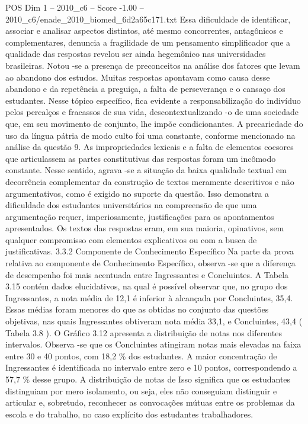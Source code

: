 \begin{textsample}{POS Dim 1 – 2010\_c6 – Score -1.00 – 2010\_c6/enade\_2010\_biomed\_6d2a65c171.txt}
Essa dificuldade de identificar, associar e analisar aspectos distintos, até mesmo concorrentes, antagônicos e complementares, denuncia a fragilidade de um pensamento simplificador que a qualidade das respostas revelou ser ainda hegemônico nas universidades brasileiras.
Notou -se a presença de preconceitos na análise dos fatores que levam ao abandono dos estudos.
Muitas respostas apontavam como causa desse abandono e da repetência a preguiça, a falta de perseverança e o cansaço dos estudantes.
Nesse tópico específico, fica evidente a responsabilização do indivíduo pelos percalços e fracassos de sua vida, descontextualizando -o de uma sociedade que, em seu movimento de conjunto, lhe impõe condicionantes.
A precariedade do uso da língua pátria de modo culto foi uma constante, conforme mencionado na análise da questão 9.
As impropriedades lexicais e a falta de elementos coesores que articulassem as partes constitutivas das respostas foram um incômodo constante.
Nesse sentido, agrava -se a situação da baixa qualidade textual em decorrência complementar da construção de textos meramente descritivos e não argumentativos, como é exigido no suporte da questão.
Isso demonstra a dificuldade dos estudantes universitários na compreensão de que uma argumentação requer, imperiosamente, justificações para os apontamentos apresentados.
Os textos das respostas eram, em sua maioria, opinativos, sem qualquer compromisso com elementos explicativos ou com a busca de justificativas. 3.3.2 Componente de Conhecimento Específico Na parte da prova relativa ao componente de Conhecimento Específico, observa -se que a diferença de desempenho foi mais acentuada entre Ingressantes e Concluintes.
A Tabela 3.15 contém dados elucidativos, na qual é possível observar que, no grupo dos Ingressantes, a nota média de 12,1 é inferior à alcançada por Concluintes, 35,4.
Essas médias foram menores do que as obtidas no conjunto das questões objetivas, nas quais Ingressantes obtiveram nota média 33,1, e Concluintes, 43,4 ( Tabela 3.8 ).
O Gráfico 3.12 apresenta a distribuição de notas nos diferentes intervalos.
Observa -se que os Concluintes atingiram notas mais elevadas na faixa entre 30 e 40 pontos, com 18,2 \% dos estudantes.
A maior concentração de Ingressantes é identificada no intervalo entre zero e 10 pontos, correspondendo a 57,7 \% desse grupo.
A distribuição de notas de Isso significa que os estudantes distinguiam por mero isolamento, ou seja, eles não conseguiam distinguir e articular e, sobretudo, reconhecer as convocações mútuas entre os problemas da escola e do trabalho, no caso explícito dos estudantes trabalhadores.

\end{textsample}

